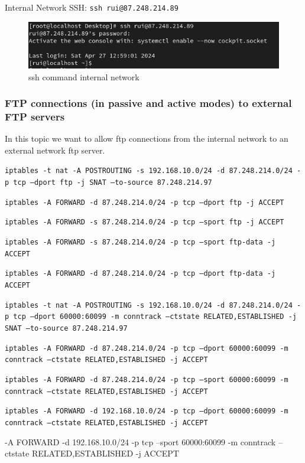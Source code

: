 \documentclass{article}
\begin{document}
\texttt{}\par
Internal Network SSH: \texttt{ssh rui@87.248.214.89} \par
\texttt{}\par
\begin{figure}[H]
    \centering
    \includegraphics[scale=0.5]{out/out_ssh_internal_to_external_sshcommand.png}
    \caption{ssh command internal network}
    \label{fig:network-arc}
\end{figure}

\subsubsection{FTP connections (in passive and active modes) to external FTP servers}
\quad In this topic we want to allow ftp connections from the internal network to an external network ftp server.

\texttt{}\par
\texttt{iptables -t nat -A POSTROUTING -s 192.168.10.0/24 -d 87.248.214.0/24 -p tcp --dport ftp -j SNAT --to-source 87.248.214.97}\par
\texttt{iptables -A FORWARD -d 87.248.214.0/24 -p tcp --dport ftp -j ACCEPT}\par
\texttt{iptables -A FORWARD -s 87.248.214.0/24 -p tcp --sport ftp -j ACCEPT}\par
\texttt{iptables -A FORWARD -s 87.248.214.0/24 -p tcp --sport ftp-data -j ACCEPT}\par
\texttt{iptables -A FORWARD -d 87.248.214.0/24 -p tcp --dport ftp-data -j ACCEPT}\par
\texttt{iptables -t nat -A POSTROUTING -s 192.168.10.0/24 -d 87.248.214.0/24 -p tcp --dport 60000:60099 -m conntrack --ctstate RELATED,ESTABLISHED -j SNAT --to-source 87.248.214.97}\par
\texttt{iptables -A FORWARD -d 87.248.214.0/24 -p tcp --dport 60000:60099 -m conntrack --ctstate RELATED,ESTABLISHED -j ACCEPT}\par
\texttt{iptables -A FORWARD -d 87.248.214.0/24 -p tcp --sport 60000:60099 -m conntrack --ctstate RELATED,ESTABLISHED -j ACCEPT}\par
\texttt{iptables -A FORWARD -d 192.168.10.0/24 -p tcp --dport 60000:60099 -m conntrack --ctstate RELATED,ESTABLISHED -j ACCEPT}\par
\textttiptables -A FORWARD -d 192.168.10.0/24 -p tcp --sport 60000:60099 -m conntrack --ctstate RELATED,ESTABLISHED -j ACCEPT{}\par
\texttt{}\par
\end{document}
